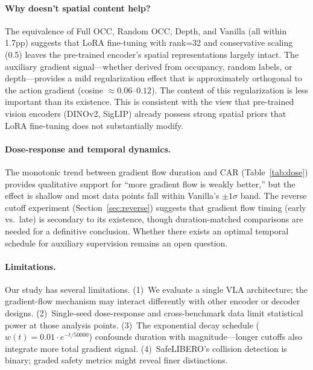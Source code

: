 \documentclass[10pt,letterpaper]{article}
\begin{document}
\paragraph{Why doesn't spatial content help?}
The equivalence of Full OCC, Random OCC, Depth, and Vanilla (all within 1.7pp) suggests that LoRA fine-tuning with rank=32 and conservative scaling (0.5) leaves the pre-trained encoder's spatial representations largely intact. The auxiliary gradient signal---whether derived from occupancy, random labels, or depth---provides a mild regularization effect that is approximately orthogonal to the action gradient (cosine $\approx 0.06$--$0.12$). The content of this regularization is less important than its existence. This is consistent with the view that pre-trained vision encoders (DINOv2, SigLIP) already possess strong spatial priors that LoRA fine-tuning does not substantially modify.

\paragraph{Dose-response and temporal dynamics.}
The monotonic trend between gradient flow duration and CAR (Table~\ref{tab:dose}) provides qualitative support for ``more gradient flow is weakly better,'' but the effect is shallow and most data points fall within Vanilla's $\pm 1\sigma$ band. The reverse cutoff experiment (Section~\ref{sec:reverse}) suggests that gradient flow timing (early vs.\ late) is secondary to its existence, though duration-matched comparisons are needed for a definitive conclusion. Whether there exists an optimal temporal schedule for auxiliary supervision remains an open question.

\paragraph{Limitations.}
Our study has several limitations. (1)~We evaluate a single VLA architecture; the gradient-flow mechanism may interact differently with other encoder or decoder designs. (2)~Single-seed dose-response and cross-benchmark data limit statistical power at those analysis points. (3)~The exponential decay schedule ($w(t) = 0.01 \cdot e^{-t/50000}$) confounds duration with magnitude---longer cutoffs also integrate more total gradient signal. (4)~SafeLIBERO's collision detection is binary; graded safety metrics might reveal finer distinctions.

\end{document}
